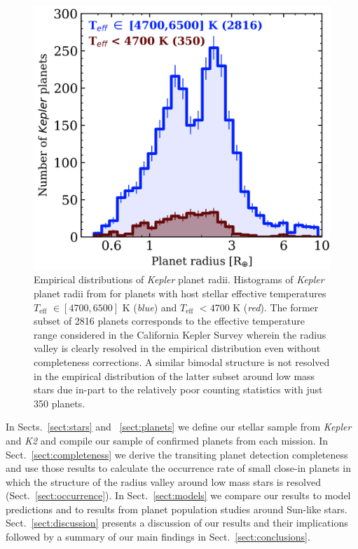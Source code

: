 \documentclass[twocolumn]{emulateapj}
\newcommand{\kepler}[1]{\emph{Kepler}#1}
\newcommand{\ktwo}[1]{\emph{K2}#1}
\newcommand{\teff}[1]{$T_{\text{eff}}$#1}
\begin{document}
\begin{figure}
  \centering
  \includegraphics[width=0.98\hsize]{figures/Bergerplanethist.png}
  \caption{Empirical distributions of \kepler{} planet radii. Histograms of \kepler{} planet radii
    from \cite{berger18} for planets with host stellar effective temperatures \teff{} $\in [4700,6500]$ K
    (\emph{blue}) and \teff{} $<4700$ K (\emph{red}). The former subset of 2816 planets corresponds to the
    effective temperature range considered in the California Kepler Survey \citep{fulton17}
    wherein the radius valley is clearly
    resolved in the empirical distribution even without completeness corrections. A similar bimodal
    structure is not resolved in the empirical distribution of the latter subset around low mass stars
    due in-part to the relatively poor counting statistics with just 350 planets.}
  \label{fig:berger}
\end{figure}


In Sects.~\ref{sect:stars} and ~\ref{sect:planets} we define our stellar sample from \kepler{} and \ktwo{}
and compile our sample of confirmed planets from each mission.
In Sect.~\ref{sect:completeness} we derive the transiting planet detection completeness and use those results
to calculate the occurrence rate of small close-in planets in which the structure of the radius valley around
low mass stars is resolved (Sect.~\ref{sect:occurrence}). In Sect.~\ref{sect:models} we compare our results to
model predictions and to results from planet population studies around Sun-like stars. 
Sect.~\ref{sect:discussion} presents a discussion of our results
and their implications followed by a summary of our main findings in Sect.~\ref{sect:conclusions}.
\end{document}
